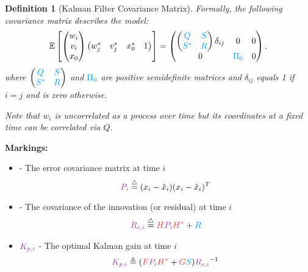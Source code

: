 \documentclass[a4 paper]{article}
\numberwithin{equation}{section}
\theoremstyle{boldStyle}
\theoremstyle{boldBlueStyle}
\theoremstyle{boldPurpleStyle}
\theoremstyle{boldRedStyle}
\newtheorem{definition}{Definition}[section]
\begin{document}
\begin{definition}[Kalman Filter Covariance Matrix] 
  Formally, the following covariance matrix describes the model:
  \begin{equation}
      \mathbb{E} \left[
      \begin{pmatrix}
          w_i \\
          v_i \\
          x_0
      \end{pmatrix}
      \begin{pmatrix}
          w_j^* & v_j^* & x_0^* & 1
      \end{pmatrix}
      \right] = 
      \begin{pmatrix}
          \begin{pmatrix}
            \tblu{Q} & \tblu{S} \\
            \tblu{S^*} & \tblu{R}
          \end{pmatrix} \delta_{ij} & 0 & 0 \\
          0 & \tblu{\Pi_0} & 0
      \end{pmatrix},
      \label{eq:covariance_matrix}
  \end{equation}
  where \(
    \begin{pmatrix}
      \tblu{Q} & \tblu{S} \\
      \tblu{S^*} & \tblu{R}
    \end{pmatrix}
  \) and \(\tblu{\Pi_0}\) are positive semidefinite matrices and \(\delta_{ij}\) equals 1 if \(i = j\) and is zero otherwise.
  
  Note that \(w_i\) is uncorrelated as a process over time but its coordinates at a fixed time can be correlated via \(Q\).
\end{definition}

\textbf{Markings:}
\begin{itemize}
    \item {} - The error covariance matrix at time \( i \)
    \begin{equation}
        \tpur{P_i} \eqdef (x_i - \hat{x}_i)(x_i - \hat{x}_i)^T
    \end{equation}

    \item {} - The covariance of the innovation (or residual) at time \( i \)
    \begin{equation}
        \tpur{R_{e,i}} \eqdef \tred{H} \tpur{P_i} \tred{H^*} + \tblu{R}  
    \end{equation}

    \item \(\tpur{K_{p,i}}\) - The optimal Kalman gain at time \( i \)
    \begin{equation}
        \tpur{K_{p,i}} \triangleq (\tred{F} \tpur{P_i} \tred{H^*} + \tred{G}\tblu{S}) \tpur{R_{e,i}}^{-1}
    \end{equation}

\end{itemize}
\end{document}
